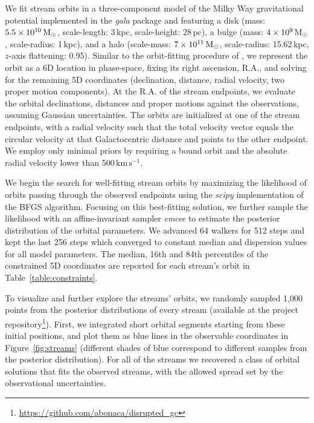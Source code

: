 \documentclass[twocolumn]{aastex63}
\newcommand{\package}[1]{\textsl{#1}}
\newcommand{\kms}{\ensuremath{\textrm{km}\,\textrm{s}^{-1}}}
\begin{document}
We fit stream orbits in a three-component model of the Milky Way gravitational potential implemented in the \package{gala} package \citep{gala} and featuring a \citet{mn:1975} disk (mass: $5.5\times10^{10}\rm\, M_\odot$, scale-length: 3\,kpc, scale-height: 28\,pc), a \citet{hernquist:1990} bulge (mass: $4\times10^9\rm\, M_\odot$, scale-radius: 1\,kpc), and a \citet{nfw:1997} halo (scale-mass: $7\times10^{11}\rm\, M_\odot$, scale-radius: 15.62\,kpc, $z$-axis flattening: 0.95).
Similar to the orbit-fitting procedure of \citet{pwb}, we represent the orbit as a 6D location in phase-space, fixing its right ascension, R.A., and solving for the remaining 5D coordinates (declination, distance, radial velocity, two proper motion components).
At the R.A. of the stream endpoints, we evaluate the orbital declinations, distances and proper motions against the observations, assuming Gaussian uncertainties.
The orbits are initialized at one of the stream endpoints, with a radial velocity such that the total velocity vector equals the circular velocity at that Galactocentric distance and points to the other endpoint.
We employ only minimal priors by requiring a bound orbit and the absolute radial velocity lower than 500\,\kms.

We begin the search for well-fitting stream orbits by maximizing the likelihood of orbits passing through the observed endpoints using the \package{scipy} implementation of the BFGS algorithm.
Focusing on this best-fitting solution, we further sample the likelihood with an affine-invariant sampler \package{emcee} to estimate the posterior distribution of the orbital parameters.
We advanced 64 walkers for 512 steps and kept the last 256 steps which converged to constant median and dispersion values for all model parameters.
The median, 16th and 84th percentiles of the constrained 5D coordinates are reported for each stream's orbit in Table~\ref{table:constraints}.

To visualize and further explore the streams' orbits, we randomly sampled 1,000 points from the posterior distributions of every stream (available at the project repository\footnote{\url{https://github.com/abonaca/disrupted_gc}}).
First, we integrated short orbital segments starting from these initial positions, and plot them as blue lines in the observable coordinates in Figure~\ref{fig:streams} (different shades of blue correspond to different samples from the posterior distribution).
For all of the streams we recovered a class of orbital solutions that fits the observed streams, with the allowed spread set by the observational uncertainties.
\end{document}

